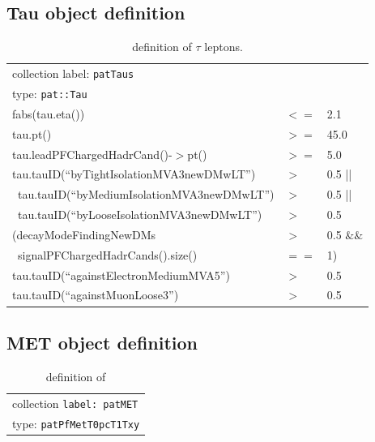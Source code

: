 \subsection{Tau object definition}

\begin{table}[htb]
  \caption{definition of \ensuremath{\tau} leptons.}
  \label{table:tauobjdefinition}
  \begin{center}
  \ttfamily\scriptsize\selectfont
  \begin{tabular}{|l|ll|}
    \hline
    \multicolumn{3}{|l|}{ collection label: \texttt{patTaus}}\\
    \multicolumn{3}{|l|}{ type: \texttt{pat::Tau}}\\
    \hline
    fabs(tau.eta()) & $<=$ & 2.1 \\
    tau.pt() & $>=$ & 45.0 \\
    tau.leadPFChargedHadrCand()-$>$pt() & $>=$ & 5.0 \\
    tau.tauID(``byTightIsolationMVA3newDMwLT'') & $>$ & 0.5 ||\\
    ~tau.tauID(``byMediumIsolationMVA3newDMwLT'') & $>$ & 0.5 ||\\
    ~tau.tauID(``byLooseIsolationMVA3newDMwLT'') & $>$ & 0.5 \\
    (decayModeFindingNewDMs & $>$ & 0.5 $\&\&$ \\
    ~signalPFChargedHadrCands().size() & $==$ & 1) \\
    tau.tauID(``againstElectronMediumMVA5'') & $>$ & 0.5 \\
    tau.tauID(``againstMuonLoose3'') & $>$ & 0.5 \\
    \hline
  \end{tabular}
  \end{center}
\end{table}

\clearpage

\subsection{MET object definition}

\begin{table}[htb]
  \caption{definition of \met}
  \label{table:metobjdefinition}
  \ttfamily\scriptsize\selectfont
  \begin{center}
   \begin{tabular}{|l|ll|}
      \hline
      \multicolumn{3}{|l|}{ collection \texttt{label: patMET}}\\
      \multicolumn{3}{|l|}{ type: \texttt{patPfMetT0pcT1Txy}}\\
      \hline
    \end{tabular}
  \end{center}
\end{table}

